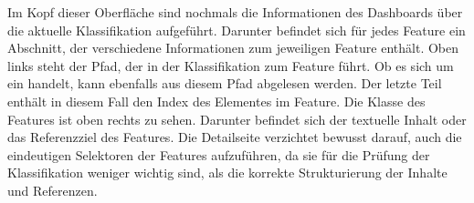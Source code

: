     Im Kopf dieser Oberfläche sind nochmals die Informationen
    des Dashboards über die aktuelle Klassifikation aufgeführt.
    Darunter befindet sich für jedes Feature ein Abschnitt,
    der verschiedene Informationen zum jeweiligen Feature enthält.
    Oben links steht der Pfad,
    der in der Klassifikation zum Feature führt.
    Ob es sich um ein {\collectionFeature} handelt,
    kann ebenfalls aus diesem Pfad abgelesen werden.
    Der letzte Teil enthält in diesem Fall den Index des Elementes im Feature.
    Die Klasse des Features ist oben rechts zu sehen.
    Darunter befindet sich der textuelle Inhalt oder das Referenzziel
    des Features.
    Die Detailseite verzichtet bewusst darauf, auch die eindeutigen Selektoren der Features aufzuführen,
    da sie für die Prüfung der Klassifikation weniger wichtig sind,
    als die korrekte Strukturierung der Inhalte und Referenzen.
